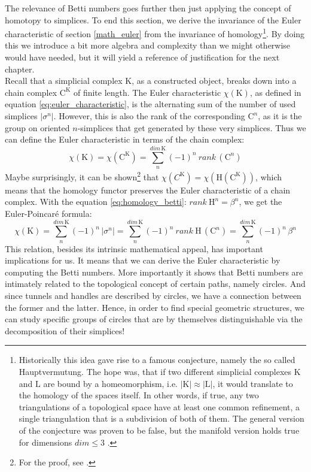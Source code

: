 The relevance of Betti numbers goes further then just applying the concept of homotopy to simplices.
To end this section, we derive the invariance of the Euler characteristic of section \ref{math_euler} from the invariance of homology\footnote{ Historically this idea gave rise to a famous conjecture, namely the so called Hauptvermutung. The hope was, that if two different simplicial complexes $\mathrm{K}$ and $\mathrm{L}$ are bound by a homeomorphism, i.e. $|\mathrm{K}| \approx |\mathrm{L}|$, it would translate to the homology of the spaces itself. In other words, if true, any two triangulations of a topological space have at least one common refinement, a single triangulation that is a subdivision of both of them. The general version of the conjecture was proven to be false, but the manifold version holds true for dimensions $dim \leq 3$ \citep[for an extensive discussion, see:][]{Ranicki1996}.}.
By doing this we introduce a bit more algebra and complexity than we might otherwise would have needed, but it will yield a reference of justification for the next chapter.\\
Recall that a simplicial complex $\mathrm{K}$, as a constructed object, breaks down into a chain complex $\mathrm{C}^{\mathrm{K}}$ of finite length.
The Euler characteristic $\chi(\mathrm{K})$, as defined in equation \eqref{eq:euler_characteristic}, is the alternating sum of the number of used simplices $|\sigma^{n}|$.
However, this is also the rank of the corresponding $\mathrm{C}^{n}$, as it is the group on oriented $n$-simplices that get generated by these very simplices.
Thus we can define the Euler characteristic in terms of the chain complex:
\begin{equation}
	\chi(\mathrm{K}) = \chi(\mathrm{C}^{\mathrm{K}}) = \sum_{n}^{dim\, \mathrm{K}} (-1)^{n}~ rank \,(\mathrm{C}^{n})
\end{equation}  
Maybe surprisingly, it can be shown\footnote{ For the proof, see \citep[][pp.155-156]{Hatcher2002}.} that $\chi(C^{\mathrm{K}}) = \chi(\mathrm{\mathrm{H}}(\mathrm{C}^{\mathrm{K}}))$, which means that the homology functor preserves the Euler characteristic of a chain complex.
With the equation \eqref{eq:homology_betti}: $rank ~\mathrm{H}^{n} = \beta^{n}$, we get the Euler-Poincaré formula:
\begin{equation} \label{eq:euler_poincare}
	\chi(\mathrm{K}) = \sum_{n}^{dim \, \mathrm{K}} (-1)^{n} \,|\sigma^{n}| =
	\sum_{n}^{dim\, \mathrm{K}} (-1)^{n}~ rank ~\mathrm{H}\,(\mathrm{C}^{n}) =
	\sum_{n}^{dim \, \mathrm{K}} (-1)^{n}\, \beta^{n}
\end{equation}
This relation, besides its intrinsic mathematical appeal, has important implications for us.
It means that we can derive the Euler characteristic by computing the Betti numbers. 
More importantly it shows that Betti numbers are intimately related to the topological concept of certain paths, namely circles.
And since tunnels and handles are described by circles, we have a connection between the former and the latter.
Hence, in order to find special geometric structures, we can study specific groups of circles that are by themselves distinguishable via the decomposition of their simplices!

